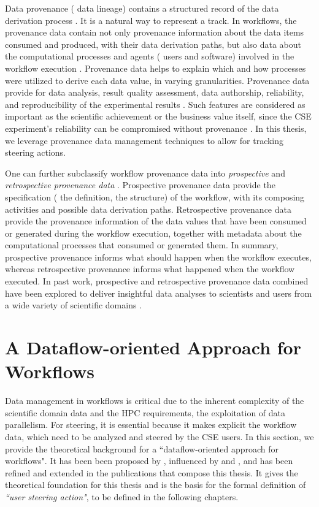 Data provenance (\ie{} data lineage) contains a structured record of the data derivation process \cite{herschel_survey_2017}. It is a natural way to represent a track. In workflows, the provenance data contain not only provenance information about the data items consumed and produced, with their data derivation paths, but also data about the computational processes and agents (\eg{} users and software) involved in the workflow execution \cite{Costa2013Capturing}.
Provenance data helps to explain which and how processes were utilized to derive
each data value, in varying granularities.
Provenance data provide for data analysis,
result quality assessment, data authorship, reliability, and reproducibility of the experimental results \cite{Freire2008Provenance,Davidson2008Provenance,herschel_survey_2017}.
Such
features are considered as important as the scientific achievement or the business value
itself, since the CSE experiment's reliability can be compromised without provenance
\cite{Freire2008Provenance}. In this thesis, we leverage provenance
data management techniques to allow for tracking steering actions.

One can further subclassify workflow provenance data into \textit{prospective} and \textit{retrospective provenance data} \cite{herschel_survey_2017,Freire2008Provenance}.
Prospective provenance data provide the specification (\ie{} the definition, the structure) of the workflow, with its composing activities and possible data derivation paths.
Retrospective provenance data provide the provenance information of the data values that have been consumed or generated during the workflow execution, together with metadata about the computational processes that consumed or generated them.
In summary, prospective provenance informs what should happen when the workflow executes, whereas retrospective provenance informs what  happened when the workflow executed.
In past work, prospective and retrospective provenance data combined have been explored to deliver insightful data analyses to scientists
and users from a wide variety of scientific domains \cite{DeOliveira2015How,Souza2015Monitoramento,Silva2017Raw,Souza2017Data,silva_adding_2018,barbosa2016applying}.


\section{A Dataflow-oriented Approach for Workflows} \label{subsec_datacentric}

Data management in workflows is critical due to the inherent complexity of
the scientific domain data and the HPC requirements, \eg{}
the exploitation of data parallelism.
For steering, it is essential because it makes explicit the workflow data, which need to be analyzed and steered by the CSE users.
In this section, we provide the theoretical background for a ``dataflow-oriented approach for workflows".
It has been been proposed by \citet{Silva2017Raw}, influenced by \citet{Ikeda2013Logical} and \citet{Ogasawara2011algebraic},
and has been refined and extended in the publications that compose this thesis.
It gives the theoretical foundation for this thesis and is the basis for the formal definition of \textit{``user steering action"}, to be defined in the following chapters.

